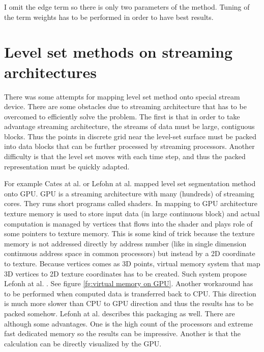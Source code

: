 I omit the edge term so there is only two parameters of the method.
Tuning of the term weights has to be performed in order to have best results.

\section{Level set methods on streaming architectures}

\par
There was some attempts for mapping level set method onto special stream device.
There are some obstacles due to streaming architecture that has to be overcomed to efficiently solve the problem.
The first is that in order to take advantage streaming architecture, the streams of data must be large, contiguous blocks.
Thus the points in discrete grid near the level-set surface must be packed into data blocks that can be further processed by streaming processors.
Another difficulty is that the level set moves with each time step, and thus the packed representation must be quickly adapted.

\par
For example Cates at al. \cite{GIST} or Lefohn at al. \cite{lefonhGPUSolver} mapped level set segmentation method onto GPU.
GPU is a streaming architecture with many (hundreds) of streaming cores. They runs short programs called shaders.
In mapping to GPU architecture texture memory is used to store input data (in large continuous block) and actual computation is managed by vertices that flows into the shader and plays role of some pointers to texture memory.
This is some kind of trick because the texture memory is not addressed directly by address number (like in single dimension continuous address space in common processors) but instead by a 2D coordinate to texture.
Because vertices comes as 3D points, virtual memory system that map 3D vertices to 2D texture coordinates has to be created.
Such system propose Lefonh at al. \cite{lefonhGPUSolver}. See figure \ref{fg:virtual memory on GPU}.
Another workaround has to be performed when computed data is transferred back to CPU.
This direction is much more slower than CPU to GPU direction and thus the results has to be packed somehow.
Lefonh at al. \cite{lefonhGPUSolver} describes this packaging as well.
There are although some advantages.
One is the high count of the processors and extreme fast dedicated memory so the results can be impressive.
Another is that the calculation can be directly visualized by the GPU.

